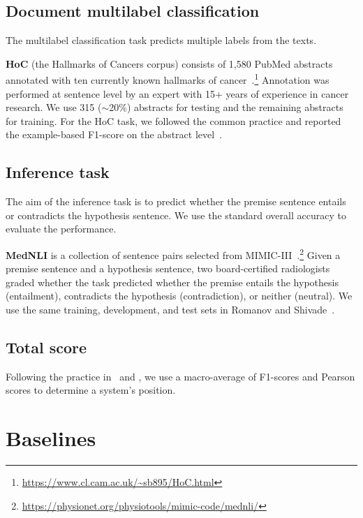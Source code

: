 \documentclass[11pt,a4paper]{article}
\begin{document}
\subsection{Document multilabel classification}

The multilabel classification task predicts multiple labels from the texts. 

\textbf{HoC} (the Hallmarks of Cancers corpus) consists of 1,580 PubMed abstracts annotated with ten currently known hallmarks of cancer~\cite{baker2016automatic}.\footnote{\url{https://www.cl.cam.ac.uk/~sb895/HoC.html}} Annotation was performed at sentence level by an expert with 15+ years of experience in cancer research. We use 315 ($\sim $20\%) abstracts for testing and the remaining abstracts for training. For the HoC task, we followed the common practice and reported the example-based F1-score on the abstract level~\cite{zhang2014review,du2018ml}.

\subsection{Inference task}

The aim of the inference task is to predict whether the premise sentence entails or contradicts the hypothesis sentence. We use the standard overall accuracy to evaluate the performance.

\textbf{MedNLI} is a collection of sentence pairs selected from MIMIC-III~\cite{romanov2018lessons}.\footnote{\url{https://physionet.org/physiotools/mimic-code/mednli/}} Given a premise sentence and a hypothesis sentence, two board-certified radiologists graded whether the task predicted whether the premise entails the hypothesis (entailment), contradicts the hypothesis (contradiction), or neither (neutral). We use the same training, development, and test sets in Romanov and Shivade~\cite{romanov2018lessons}.

\subsection{Total score}

Following the practice in~\citet{wang2018glue} and \citet{lee2019biobert}, we use a macro-average of F1-scores and Pearson scores to determine a system's position.

\section{Baselines}
\end{document}
